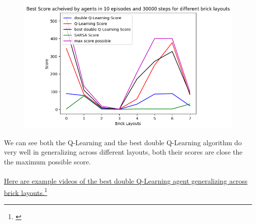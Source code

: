 \documentclass[twoside,11pt]{article}
\newcommand\fnurl[2]{%
  \href{#2}{#1}\footnote{\url{#2}}%
}
\begin{document}
\begin{figure}[H]
\includegraphics[scale=0.6]{BrickLayouts_generalization_tests}
\centering
\end{figure}
We can see both the Q-Learning and the best double Q-Learning algorithm do very well in generalizing across different layouts, both their scores are close the the maximum possible score.
\\\\
\fnurl{Here are example videos of the best double Q-Learning agent generalizing across brick layouts.}{}
\end{document}

